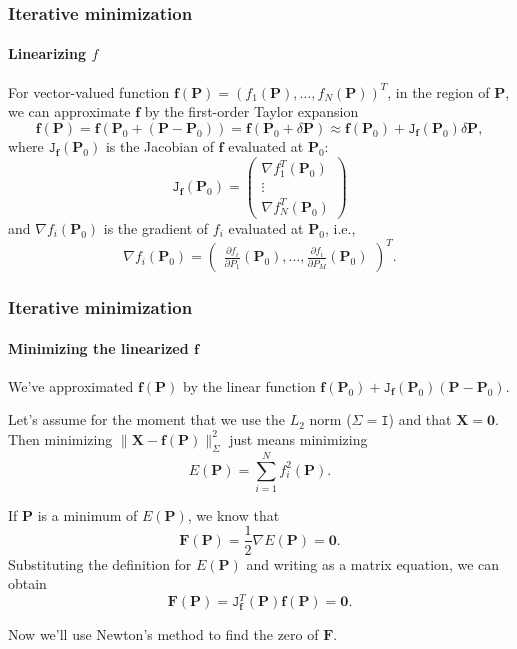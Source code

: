 \documentclass[aspectratio=169]{beamer}
\renewcommand{\vec}[1]{\boldsymbol{#1}}
\newcommand{\mat}[1]{\mathtt{#1}}
\begin{document}
\begin{frame}
\frametitle{Iterative minimization}
\framesubtitle{Linearizing $f$}

For vector-valued function $\vec{f}(\vec{P}) =
(f_1(\vec{P}),\ldots,f_N(\vec{P}))^T$, in the region of $\vec{P}$, we
can approximate $\vec{f}$ by the \alert{first-order Taylor expansion}
\begin{equation*}
\vec{f}(\vec{P}) =
\vec{f}\left(\vec{P}_0+(\vec{P}-\vec{P}_0)\right) =
\vec{f}(\vec{P}_0+\delta\vec{P}) \approx
\vec{f}(\vec{P}_0) + \mat{J}_{\vec{f}}(\vec{P}_0)\delta\vec{P},
\end{equation*}
where $\mat{J}_{\vec{f}}(\vec{P}_0)$ is the \alert{Jacobian} of $\vec{f}$
evaluated at $\vec{P}_0$:
\begin{equation*}
\mat{J}_{\vec{f}}(\vec{P}_0) =
\begin{pmatrix}
\nabla f_1^T(\vec{P}_0) \\
\vdots \\
\nabla f_N^T(\vec{P}_0)
\end{pmatrix}
\end{equation*}
and $\nabla f_i(\vec{P}_0)$ is the \alert{gradient} of $f_i$ evaluated
at $\vec{P}_0$, i.e.,
\begin{equation*}
\nabla f_i(\vec{P}_0) =
\begin{pmatrix}
\frac{\partial f_i}{\partial P_1}(\vec{P}_0),\ldots,
\frac{\partial f_i}{\partial P_M}(\vec{P}_0)
\end{pmatrix}^T.
\end{equation*}

\end{frame}


\begin{frame}
\frametitle{Iterative minimization}
\framesubtitle{Minimizing the linearized $\vec{f}$}

We've approximated $\vec{f}(\vec{P})$ by the linear function
$\vec{f}(\vec{P}_0) + \mat{J}_{\vec{f}}(\vec{P}_0)(\vec{P}-\vec{P}_0)$.

\medskip

Let's assume for the moment that we use the $L_2$ norm
($\mat{\Sigma}=\mat{I}$) and that
$\vec{X}=\vec{0}$.  Then minimizing
$\|\vec{X}-\vec{f}(\vec{P})\|^2_{\Sigma}$ just means minimizing
\begin{equation*}
E(\vec{P}) = \sum_{i=1}^N f_i^2(\vec{P}).
\end{equation*}

\medskip

If $\vec{P}$ is a minimum of $E(\vec{P})$, we know that
\begin{equation*}
\vec{F}(\vec{P})=\frac{1}{2} \nabla E(\vec{P}) = \vec{0}.
\end{equation*}
Substituting the definition for $E(\vec{P})$ and writing as a matrix
equation, we can obtain
\begin{equation*}
\vec{F}(\vec{P})=\mat{J}_{\vec{f}}^T(\vec{P})\vec{f}(\vec{P}) = \vec{0}.
\end{equation*}

\medskip

Now we'll use \alert{Newton's method} to find the zero of $\vec{F}$.

\end{frame}
\end{document}
